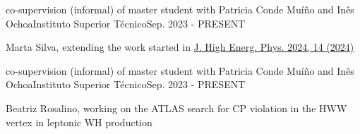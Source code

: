 
\begin{cventries}
    {co-supervision (informal) of master student with Patricia Conde Muíño and Inês Ochoa}{Instituto Superior Técnico}{Sep. 2023 - PRESENT}
    {
        \begin{cvitems}
            \item {Marta Silva, extending the work started in \href{https://doi.org/10.1007/JHEP04(2024)014}{J. High Energ. Phys. 2024, 14 (2024)}}
        \end{cvitems}
    }\vspace*{2mm}

    {co-supervision (informal) of master student with Patricia Conde Muíño and Inês Ochoa}{Instituto Superior Técnico}{Sep. 2023 - PRESENT}
    {
        \begin{cvitems}
            \item {Beatriz Rosalino, working on the ATLAS search for CP violation in the HWW vertex in leptonic WH production}
        \end{cvitems}
    }
    

\end{cventries}